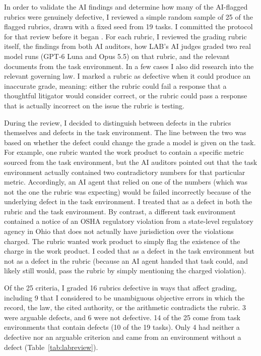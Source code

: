 \documentclass[11pt]{article}
\newcommand{\labSample}{25}
\newcommand{\labSampleTasks}{19}
\newcommand{\labDefective}{16}
\newcommand{\labArguable}{3}
\newcommand{\labNotDefective}{6}
\newcommand{\labObjective}{9}
\newcommand{\labEnvItems}{14}
\newcommand{\labEnvTasks}{10}
\newcommand{\labNoDefect}{4}
\begin{document}
In order to validate the AI findings and determine how many of the AI-flagged rubrics were genuinely defective, I reviewed a simple random sample of \labSample{} of the flagged rubrics, drawn with a fixed seed from \labSampleTasks{} tasks. I committed the protocol for that review before it began \citep{labreview}. For each rubric, I reviewed the grading rubric itself, the findings from both AI auditors, how LAB's AI judges graded two real model runs (GPT-6 Luna and Opus 5.5) on that rubric, and the relevant documents from the task environment. In a few cases I also did research into the relevant governing law. I marked a rubric as defective when it could produce an inaccurate grade, meaning: either the rubric could fail a response that a thoughtful litigator would consider correct, or the rubric could pass a response that is actually incorrect on the issue the rubric is testing.

During the review, I decided to distinguish between defects in the rubrics themselves and defects in the task environment. The line between the two was based on whether the defect could change the grade a model is given on the task. For example, one rubric wanted the work product to contain a specific metric sourced from the task environment, but the AI auditors pointed out that the task environment actually contained two contradictory numbers for that particular metric. Accordingly, an AI agent that relied on one of the numbers (which was not the one the rubric was expecting) would be failed incorrectly because of the underlying defect in the task environment. I treated that as a defect in both the rubric and the task environment. By contrast, a different task environment contained a notice of an OSHA regulatory violation from a state-level regulatory agency in Ohio that does not actually have jurisdiction over the violations charged. The rubric wanted work product to simply flag the existence of the charge in the work product. I coded that as a defect in the task environment but not as a defect in the rubric (because an AI agent handed that task could, and likely still would, pass the rubric by simply mentioning the charged violation).

Of the \labSample{} criteria, I graded \labDefective{} rubrics defective in ways that affect grading, including \labObjective{} that I considered to be unambiguous objective errors in which the record, the law, the cited authority, or the arithmetic contradicts the rubric. \labArguable{} were arguable defects, and \labNotDefective{} were not defective. \labEnvItems{} of the \labSample{} come from task environments that contain defects (\labEnvTasks{} of the \labSampleTasks{} tasks). Only \labNoDefect{} had neither a defective nor an arguable criterion and came from an environment without a defect (Table~\ref{tab:labreview}).
\end{document}
